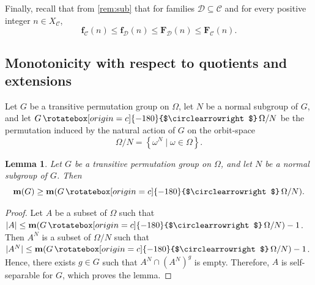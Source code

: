 \documentclass[a4paper]{amsart}
\newcommand{\f}{\mathbf{f}}
\newcommand{\F}{\mathbf{F}}
\newcommand{\m}{\mathbf{m}}
\newcommand{\C}{\mathcal{C}}
\newcommand{\D}{\mathcal{D}}
\newcommand{\act}{\,\rotatebox[origin=c]{-180}{$\circlearrowright$}\,}
\newtheorem{lemma}[theorem]{Lemma}
\theoremstyle{definition}
\begin{document}
Finally, recall that from \cref{rem:sub} that for families $\D\subseteq \C$ and for every positive integer $n\in X_\C$,
\[\f_\C(n) \le \f_\D(n) \le \F_\D(n) \le \F_\C(n) .\]

\subsection{Monotonicity with respect to quotients and extensions}\label{sec:extension}
Let $G$ be a transitive permutation group on $\Omega$, let $N$ be a normal subgroup of $G$, and let $G \act \Omega/N$ be the permutation induced by the natural action of $G$ on the orbit-space
\[\Omega/N = \left\{ \omega^N \mid \omega \in \Omega \right\} .\]
\begin{lemma}\label{lem:quotient}
    Let $G$ be a transitive permutation group on $\Omega$, and let $N$ be a normal subgroup of $G$.
    Then \[ \m(G) \geq \m(G \act \Omega/N).\]
\end{lemma}
\begin{proof}
    Let $A$ be a subset of $\Omega$ such that $|A| \leq \m(G \act \Omega/N) - 1$. Then $A^N$ is a subset of $\Omega/N$ such that $|A^N| \leq  \m(G \act \Omega/N) -1 $. Hence, there exists $g \in G$ such that $A^N \cap (A^N)^g$ is empty. Therefore, $A$ is self-separable for $G$, which proves the lemma.
\end{proof}
\end{document}
